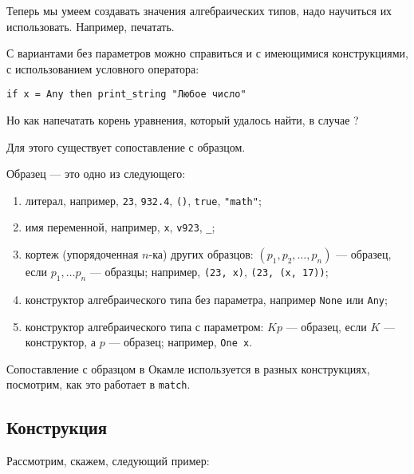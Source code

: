 Теперь мы умеем создавать значения алгебраических типов, 
надо научиться их использовать. Например, печатать.

С вариантами без параметров можно справиться и с имеющимися конструкциями,
с использованием условного оператора:
\begin{verbatim}if x = Any then print_string "Любое число"\end{verbatim}%
Но как напечатать корень уравнения, который удалось найти, в случае ?

Для этого существует сопоставление с образцом.



Образец --- это одно из следующего:

\begin{enumerate}
\item литерал, например, \verb!23!, \verb!932.4!, \verb!()!, \verb!true!, \verb!"math"!;
\item имя переменной, например, \verb!x!, \verb!v923!, \verb!_!;
\item кортеж (упорядоченная $n$-ка) других образцов: $(p_1, p_2, \dots, p_n)$ --- образец, если $p_1, \dots p_n$ --- образцы;
например, \verb!(23, x)!, \verb!(23, (x, 17))!;
\item конструктор алгебраического типа без параметра, например \verb!None! или \verb!Any!;
\item конструктор алгебраического типа с параметром: $K p$ --- образец, если $K$ --- конструктор, а $p$ --- образец; например, \verb!One x!.
\end{enumerate}

Сопоставление с образцом в Окамле используется в разных конструкциях,
посмотрим, как это работает в \verb!match!.

\subsection{Конструкция }

Рассмотрим, скажем, следующий пример:


